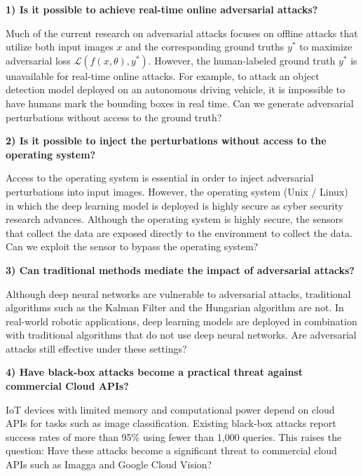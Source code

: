 \vspace{0.5cm}

\textbf{1) Is it possible to achieve real-time online adversarial attacks?}

Much of the current research on adversarial attacks focuses on offline attacks that utilize both input images $x$ and the corresponding ground truths $y^*$ to maximize adversarial loss $\mathcal{L}(f(x, \theta), y^*)$. However, the human-labeled ground truth $y^*$ is unavailable for real-time online attacks. For example, to attack an object detection model deployed on an autonomous driving vehicle, it is impossible to have humans mark the bounding boxes in real time. Can we generate adversarial perturbations without access to the ground truth?

\vspace{0.5cm}

\textbf{2) Is it possible to inject the perturbations without access to the operating system?}

Access to the operating system is essential in order to inject adversarial perturbations into input images. However, the operating system (Unix / Linux) in which the deep learning model is deployed is highly secure as cyber security research advances. Although the operating system is highly secure, the sensors that collect the data are exposed directly to the environment to collect the data. Can we exploit the sensor to bypass the operating system?

\vspace{0.5cm}

\textbf{3) Can traditional methods mediate the impact of adversarial attacks?}

Although deep neural networks are vulnerable to adversarial attacks, traditional algorithms such as the Kalman Filter and the Hungarian algorithm are not. In real-world robotic applications, deep learning models are deployed in combination with traditional algorithms that do not use deep neural networks. Are adversarial attacks still effective under these settings?

\clearpage

\textbf{4) Have black-box attacks become a practical threat against commercial Cloud APIs?}
\label{question_4}

IoT devices with limited memory and computational power depend on cloud APIs for tasks such as image classification. Existing black-box attacks report success rates of more than 95\% using fewer than 1,000 queries. This raises the question: Have these attacks become a significant threat to commercial cloud APIs such as Imagga and Google Cloud Vision?

